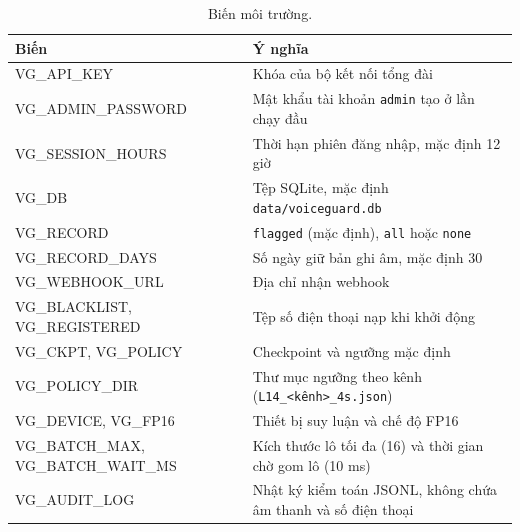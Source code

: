 \documentclass[11pt]{article}
\begin{document}
\begin{table}[tbp]
  \centering\small
  \caption{Biến môi trường.}
  \label{tab:env}
  \begin{tabularx}{\linewidth}{@{}>{\ttfamily}lX@{}}
    \toprule
    \normalfont\textbf{Biến} & \textbf{Ý nghĩa} \\
    \midrule
    VG\_API\_KEY & Khóa của bộ kết nối tổng đài \\
    VG\_ADMIN\_PASSWORD & Mật khẩu tài khoản \texttt{admin} tạo ở lần chạy đầu \\
    VG\_SESSION\_HOURS & Thời hạn phiên đăng nhập, mặc định 12 giờ \\
    VG\_DB & Tệp SQLite, mặc định \texttt{data/voiceguard.db} \\
    VG\_RECORD & \texttt{flagged} (mặc định), \texttt{all} hoặc \texttt{none} \\
    VG\_RECORD\_DAYS & Số ngày giữ bản ghi âm, mặc định 30 \\
    VG\_WEBHOOK\_URL & Địa chỉ nhận webhook \\
    VG\_BLACKLIST, VG\_REGISTERED & Tệp số điện thoại nạp khi khởi động \\
    VG\_CKPT, VG\_POLICY & Checkpoint và ngưỡng mặc định \\
    VG\_POLICY\_DIR & Thư mục ngưỡng theo kênh (\texttt{L14\_<kênh>\_4s.json}) \\
    VG\_DEVICE, VG\_FP16 & Thiết bị suy luận và chế độ FP16 \\
    VG\_BATCH\_MAX, VG\_BATCH\_WAIT\_MS & Kích thước lô tối đa (16) và thời gian chờ gom lô (10 ms) \\
    VG\_AUDIT\_LOG & Nhật ký kiểm toán JSONL, không chứa âm thanh và số điện thoại \\
    \bottomrule
  \end{tabularx}
\end{table}
\end{document}
